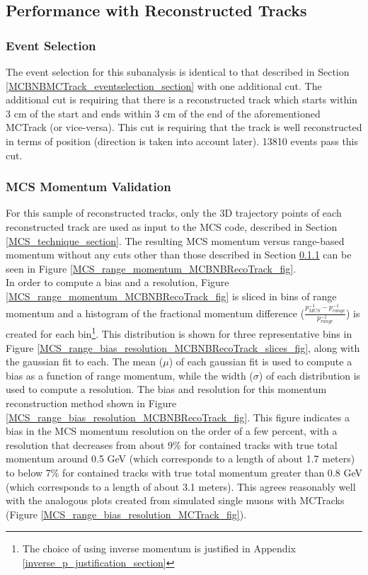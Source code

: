 \subsection{Performance with Reconstructed Tracks}\label{MCBNBRecoTrack_performance_section}

\subsubsection{Event Selection}\label{MCBNBRecoTrack_eventselection_section}
The event selection for this subanalysis is identical to that described in Section \ref{MCBNBMCTrack_eventselection_section} with one additional cut. The additional cut is requiring that there is a reconstructed track which starts within 3 cm of the start and ends within 3 cm of the end of the aforementioned {\sc MCTrack} (or vice-versa). This cut is requiring that the track is well reconstructed in terms of position (direction is taken into account later). 13810 events pass this cut.

\subsubsection{MCS Momentum Validation}\label{MCS_Momentum_Validation_MCBNBRecoTrack_section}
For this sample of reconstructed tracks, only the 3D trajectory points of each reconstructed track are used as input to the MCS code, described in Section \ref{MCS_technique_section}. The resulting MCS momentum versus range-based momentum without any cuts other than those described in Section \ref{MCBNBRecoTrack_eventselection_section} can be seen in Figure \ref{MCS_range_momentum_MCBNBRecoTrack_fig}. \\

In order to compute a bias and a resolution, Figure \ref{MCS_range_momentum_MCBNBRecoTrack_fig} is sliced in bins of range momentum and a histogram of the fractional momentum difference ($\frac{p_{MCS}^{-1} - p_{range}^{-1}}{p_{range}^{-1}}$) is created for each bin\footnote{The choice of using inverse momentum is justified in Appendix \ref{inverse_p_justification_section}}. This distribution is shown for three representative bins in Figure \ref{MCS_range_bias_resolution_MCBNBRecoTrack_slices_fig}, along with the gaussian fit to each.  The mean ($\mu$) of each gaussian fit is used to compute a bias as a function of range momentum, while the width ($\sigma$) of each distribution is used to compute a resolution. The bias and resolution for this momentum reconstruction method shown in Figure \ref{MCS_range_bias_resolution_MCBNBRecoTrack_fig}. This figure indicates a bias in the MCS momentum resolution on the order of a few percent, with a resolution that decreases from about 9\% for contained tracks with true total momentum around 0.5 GeV (which corresponds to a length of about 1.7 meters) to below 7\% for contained tracks with true total momentum greater than 0.8 GeV (which corresponds to a length of about 3.1 meters). This agrees reasonably well with the analogous plots created from simulated single muons with {\sc MCTracks} (Figure \ref{MCS_range_bias_resolution_MCTrack_fig}).


